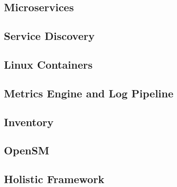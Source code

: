 \subsection{Microservices}



\subsection{Service Discovery}


\subsection{Linux Containers}


\subsection{Metrics Engine and Log Pipeline}




\subsection{Inventory}


\subsection{OpenSM}


\subsection{Holistic Framework}

